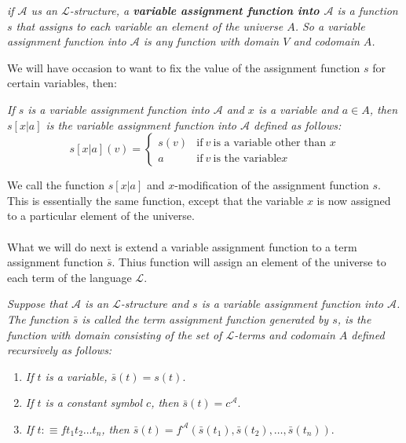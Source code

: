 \documentclass[10pt,a4paper]{article}
\newcommand{\curveL}{\mathcal{L}}
\newcommand{\curveA}{\mathcal{A}}
\begin{document}
                    \begin{define}
                        \textit{if $\curveA$ us an $\curveL$-structure, a \textbf{variable assignment function into $\curveA$} is a function $s$ that assigns to each variable an element of the universe $A$. So a variable assignment function into $\curveA$ is any function with domain $V$ and codomain $A$.}
                    \end{define}
                    We will have occasion to want to fix the value of the assignment function $s$ for certain variables, then:
                    \begin{define}
                        \textit{If $s$ is a variable assignment function into $\curveA$ and $x$ is a variable and $a\in A$, then $s[x|a]$ is the variable assignment function into $\curveA$ defined as follows:}
                        \begin{equation}
                            s[x|a](v) = \left\{
                                \begin{matrix}
                                    s(v) & \text{if} \ v \ \text{is a variable other than }x\\
                                    a & \text{if} \ v \ \text{is the variable} x 
                                \end{matrix}\right.
                        \end{equation}
                    \end{define} 
                    We call the function $s[x|a]$ and $x$-modification of the assignment function $s$. This is essentially the same function, except that the variable $x$ is now assigned to a particular element of the universe.
                    \\
                    \\
                    What we will do next is extend a variable assignment function to a term assignment function $\bar s$. Thius function will assign an element of the universe to each term of the language $\curveL$.
                    \begin{define}
                        \textit{Suppose that $\curveA$ is an $\curveL$-structure and $s$ is a variable assignment function into $\curveA$. The function $\bar s$ is called the term assignment function generated by $s$, is the function with domain consisting of the set of 
                        $\curveL$-terms and codomain $A$ defined recursively as follows:}
                        \begin{enumerate}
                            \item \textit{If $t$ is a variable, $\bar s(t) = s(t)$}.
                            \item \textit{If $t$ is a constant symbol $c$, then $\bar s(t)= c^\curveA$}.
                            \item \textit{If $t:\equiv ft_1t_2\dots t_n$, then $\bar s(t) = f^\curveA (\bar s(t_1),\bar s(t_2),\dots,\bar s(t_n))$}.
                        \end{enumerate}
                    \end{define}
\end{document}
